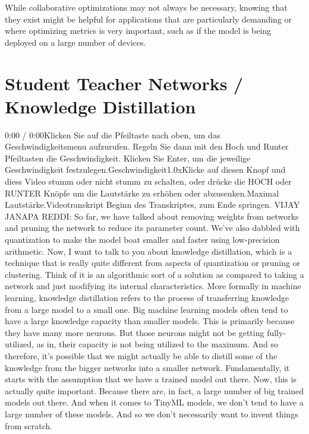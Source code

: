 {{{{{    While collaborative optimizations may not always be necessary, knowing that they exist might be helpful for applications that are particularly demanding or where optimizing metrics is very important, such as if the model is being deployed on a large number of devices.
 
\section{Student Teacher Networks / Knowledge Distillation}

    0:00 / 0:00Klicken Sie auf die Pfeiltaste nach oben, um das Geschwindigkeitsmenu aufzurufen. Regeln Sie dann mit den Hoch und Runter Pfeiltasten die Geschwindigkeit. Klicken Sie Enter, um die jeweilige Geschwindigkeit festzulegen.Geschwindigkeit1.0xKlicke auf diesen Knopf und diess Video stumm oder nicht stumm zu schalten, oder drücke die HOCH oder RUNTER Knöpfe um die Lautstärke zu erhöhen oder abzusenken.Maximal Lautstärke.Videotranskript
    Beginn des Transkriptes, zum Ende springen.
    VIJAY JANAPA REDDI: So far, we have talked
    about removing weights from networks and pruning the network
    to reduce its parameter count.
    We've also dabbled with quantization to make the model boat smaller and faster
    using low-precision arithmetic.
    Now, I want to talk to you about knowledge distillation, which
    is a technique that is really quite different from aspects of quantization
    or pruning or clustering.
    Think of it is an algorithmic sort of a solution as
    compared to taking a network and just modifying its internal characteristics.
    More formally in machine learning, knowledge distillation
    refers to the process of transferring knowledge
    from a large model to a small one.
    Big machine learning models often tend to have a large knowledge
    capacity than smaller models.
    This is primarily because they have many more neurons.
    But those neurons might not be getting fully-utilized,
    as in, their capacity is not being utilized to the maximum.
    And so therefore, it's possible that we might actually
    be able to distill some of the knowledge from the bigger networks
    into a smaller network.
    Fundamentally, it starts with the assumption
    that we have a trained model out there.
    Now, this is actually quite important.
    Because there are, in fact, a large number of big trained models out there.
    And when it comes to TinyML models, we don't tend
    to have a large number of these models.
    And so we don't necessarily want to invent things from scratch.
}}}}}
